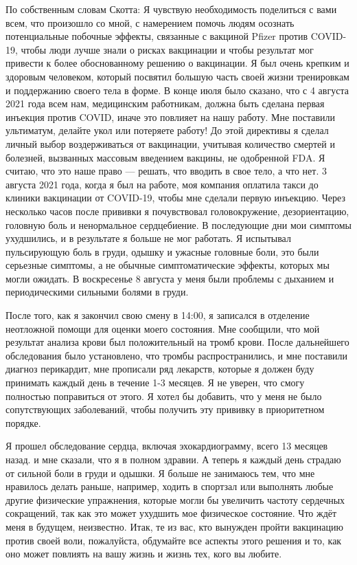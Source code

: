 По собственным словам Скотта: Я чувствую необходимость поделиться с вами всем,
что произошло со мной, с намерением помочь людям осознать потенциальные побочные
эффекты, связанные с вакциной Pfizer против COVID-19, чтобы люди лучше знали о
рисках вакцинации и чтобы результат мог привести к более обоснованному решению о
вакцинации. Я был очень крепким и здоровым человеком, который посвятил большую
часть своей жизни тренировкам и поддержанию своего тела в форме. В конце июля
было сказано, что с 4 августа 2021 года всем нам, медицинским работникам, должна
быть сделана первая инъекция против COVID, иначе это повлияет на нашу
работу. Мне поставили ультиматум, делайте укол или потеряете работу! До этой
директивы я сделал личный выбор воздерживаться от вакцинации, учитывая
количество смертей и болезней, вызванных массовым введением вакцины, не
одобренной FDA. Я считаю, что это наше право — решать, что вводить в свое тело,
а что нет. 3 августа 2021 года, когда я был на работе, моя компания оплатила
такси до клиники вакцинации от COVID-19, чтобы мне сделали первую
инъекцию. Через несколько часов после прививки я почувствовал головокружение,
дезориентацию, головную боль и ненормальное сердцебиение. В последующие дни мои
симптомы ухудшились, и в результате я больше не мог работать. Я испытывал
пульсирующую боль в груди, одышку и ужасные головные боли, это были серьезные
симптомы, а не обычные симптоматические эффекты, которых мы могли ожидать. В
воскресенье 8 августа у меня были проблемы с дыханием и периодическими сильными
болями в груди.

После того, как я закончил свою смену в 14:00, я записался в отделение
неотложной помощи для оценки моего состояния. Мне сообщили, что мой результат
анализа крови был положительный на тромб крови. После дальнейшего обследования
было установлено, что тромбы распространились, и мне поставили диагноз
перикардит, мне прописали ряд лекарств, которые я должен буду принимать каждый
день в течение 1-3 месяцев. Я не уверен, что смогу полностью поправиться от
этого. Я хотел бы добавить, что у меня не было сопутствующих заболеваний, чтобы
получить эту прививку в приоритетном порядке.

Я прошел обследование сердца, включая эхокардиограмму, всего 13 месяцев назад. и
мне сказали, что я в полном здравии. А теперь я каждый день страдаю от сильной
боли в груди и одышки. Я больше не занимаюсь тем, что мне нравилось делать
раньше, например, ходить в спортзал или выполнять любые другие физические
упражнения, которые могли бы увеличить частоту сердечных сокращений, так как это
может ухудшить мое физическое состояние. Что ждёт меня в будущем,
неизвестно. Итак, те из вас, кто вынужден пройти вакцинацию против своей воли,
пожалуйста, обдумайте все аспекты этого решения и то, как оно может повлиять на
вашу жизнь и жизнь тех, кого вы любите.
